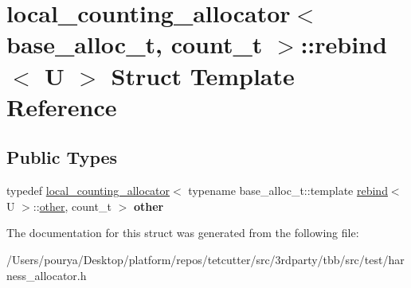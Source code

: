 \hypertarget{structlocal__counting__allocator_1_1rebind}{}\section{local\+\_\+counting\+\_\+allocator$<$ base\+\_\+alloc\+\_\+t, count\+\_\+t $>$\+:\+:rebind$<$ U $>$ Struct Template Reference}
\label{structlocal__counting__allocator_1_1rebind}
\subsection*{Public Types}
\begin{DoxyCompactItemize}
\item 
\hypertarget{structlocal__counting__allocator_1_1rebind_af6d5565f18c3614b13fe875c9f026dd4}{}typedef \hyperlink{classlocal__counting__allocator}{local\+\_\+counting\+\_\+allocator}$<$ typename base\+\_\+alloc\+\_\+t\+::template \hyperlink{structlocal__counting__allocator_1_1rebind}{rebind}$<$ U $>$\+::\hyperlink{classlocal__counting__allocator}{other}, count\+\_\+t $>$ {\bfseries other}\label{structlocal__counting__allocator_1_1rebind_af6d5565f18c3614b13fe875c9f026dd4}

\end{DoxyCompactItemize}


The documentation for this struct was generated from the following file\+:\begin{DoxyCompactItemize}
\item 
/\+Users/pourya/\+Desktop/platform/repos/tetcutter/src/3rdparty/tbb/src/test/harness\+\_\+allocator.\+h\end{DoxyCompactItemize}
